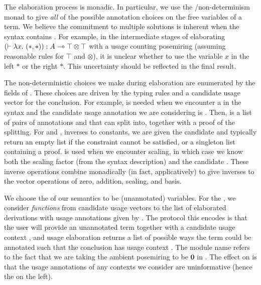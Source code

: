 The elaboration process is monadic.
In particular, we use the /non-determinism monad to give
\emph{all} of the possible annotation choices on the free variables of a term.
We believe the commitment to multiple solutions is inherent when the syntax
contains .
For example, in the intermediate stages of elaborating
$\plr{\vdash \lambda x.~\plr{*,*}} : A \multimap \top \otimes \top$ with a
usage counting posemiring (assuming reasonable rules for $\top$ and $\otimes$),
it is unclear whether to use the variable $x$ in the left $*$ or the right $*$.
This uncertainty should be reflected in the final result.

The non-deterministic choices we make during elaboration are enumerated by
the fields of .
These choices are driven by the typing rules and a candidate usage vector for
the conclusion.
For example, \AgdaSpace{} is needed when we
encounter a  in the syntax and the candidate
usage annotation we are considering is .
Then, \AgdaSpace{} is a list of pairs of
annotations  and  that  can split into,
together with a proof of the splitting.
For  and , inverses to constants,
we are given the candidate  and typically return an empty list if
the constraint cannot be satisfied, or a singleton list containing a proof.
 is used when we encounter scaling, in which case we know
both the scaling factor  (from the syntax description) and the
candidate .
These inverse operations combine monadically (in fact, applicatively) to give
inverses to the vector operations of zero, addition, scaling, and basis.


We choose the \AgdaBound{$\V$} of our semantics to be (unannotated) variables.
For the \AgdaBound{$\C$}, we consider \emph{functions} from candidate usage
vectors  to the list of elaborated derivations with usage
annotations given by .
The protocol this encodes is that the user will provide an unannotated term
together with a candidate usage context , and usage elaboration
returns a list of possible ways the term could be annotated such that the
conclusion has usage context .
The module name  refers to the fact that we are taking the
ambient posemiring to be $\mathbf0$ in .
The effect on  is that the usage annotations of any
contexts we consider are uninformative (hence the \AgdaSymbol{\_} on the left).

